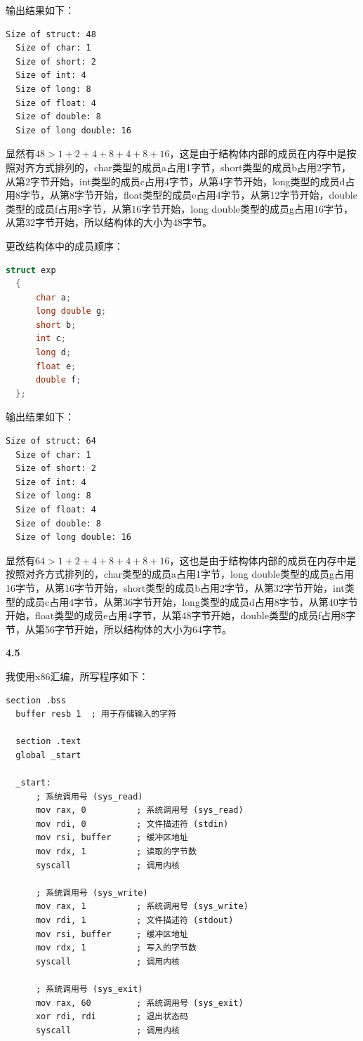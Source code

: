 \documentclass[UTF8]{report}
\begin{document}
输出结果如下：

\begin{lstlisting}[language=bash]
  Size of struct: 48
  Size of char: 1
  Size of short: 2
  Size of int: 4
  Size of long: 8
  Size of float: 4
  Size of double: 8
  Size of long double: 16
\end{lstlisting}

显然有$48 > 1 + 2 + 4 + 8 + 4 + 8 + 16$，这是由于结构体内部的成员在内存中是按照对齐方式排列的，char类型的成员a占用1字节，short类型的成员b占用2字节，从第2字节开始，int类型的成员c占用4字节，从第4字节开始，long类型的成员d占用8字节，从第8字节开始，float类型的成员e占用4字节，从第12字节开始，double类型的成员f占用8字节，从第16字节开始，long double类型的成员g占用16字节，从第32字节开始，所以结构体的大小为48字节。

更改结构体中的成员顺序：

\begin{lstlisting}[language=C]
  struct exp
  {
      char a;
      long double g;
      short b;
      int c;
      long d;
      float e;
      double f;
  };
\end{lstlisting}

输出结果如下：

\begin{lstlisting}[language=bash]
  Size of struct: 64
  Size of char: 1
  Size of short: 2
  Size of int: 4
  Size of long: 8
  Size of float: 4
  Size of double: 8
  Size of long double: 16
\end{lstlisting}

显然有$64 > 1 + 2 + 4 + 8 + 4 + 8 + 16$，这也是由于结构体内部的成员在内存中是按照对齐方式排列的，char类型的成员a占用1字节，long double类型的成员g占用16字节，从第16字节开始，short类型的成员b占用2字节，从第32字节开始，int类型的成员c占用4字节，从第36字节开始，long类型的成员d占用8字节，从第40字节开始，float类型的成员e占用4字节，从第48字节开始，double类型的成员f占用8字节，从第56字节开始，所以结构体的大小为64字节。

\noindent
\textbf{4.5}

我使用x86汇编，所写程序如下：

\begin{lstlisting}[language={[x86masm]Assembler}]
  section .bss
  buffer resb 1  ; 用于存储输入的字符
  
  section .text
  global _start
  
  _start:
      ; 系统调用号 (sys_read)
      mov rax, 0          ; 系统调用号 (sys_read)
      mov rdi, 0          ; 文件描述符 (stdin)
      mov rsi, buffer     ; 缓冲区地址
      mov rdx, 1          ; 读取的字节数
      syscall             ; 调用内核
  
      ; 系统调用号 (sys_write)
      mov rax, 1          ; 系统调用号 (sys_write)
      mov rdi, 1          ; 文件描述符 (stdout)
      mov rsi, buffer     ; 缓冲区地址
      mov rdx, 1          ; 写入的字节数
      syscall             ; 调用内核
  
      ; 系统调用号 (sys_exit)
      mov rax, 60         ; 系统调用号 (sys_exit)
      xor rdi, rdi        ; 退出状态码
      syscall             ; 调用内核
\end{lstlisting}
\end{document}
